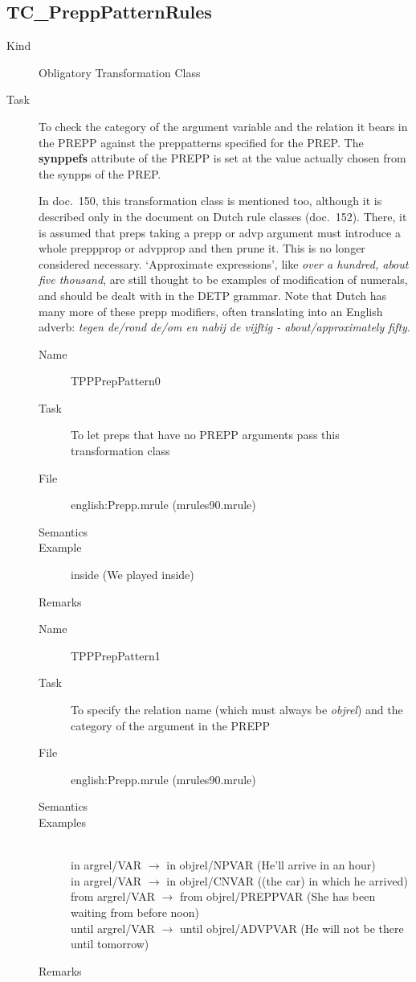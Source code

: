 \newpage
\subsection{TC\_PreppPatternRules}
\begin{description}
\item[Kind] Obligatory Transformation Class
\item[Task] To check the category of the argument variable and the relation 
it bears in the PREPP against the preppatterns specified for the PREP. The {\bf 
synppefs} attribute of the PREPP is set at the value 
actually chosen from the synpps of the PREP.

In doc.\ 150, this transformation class is mentioned too, although it is 
described only in the document on Dutch rule classes (doc.\ 152). There, it is 
assumed that preps taking a prepp or advp argument must introduce a whole 
preppprop or advpprop and then prune it. This is no longer considered 
necessary. `Approximate 
expressions', like {\em over a hundred, about five thousand\/}, are still 
thought to be examples of modification of numerals, and should be dealt with in 
the DETP grammar. Note that Dutch has many more of these prepp modifiers, often 
translating into an English adverb: {\em tegen de/rond de/om en nabij de 
vijftig - about/approximately fifty\/}.

\vspace{1 cm}
\begin{description}
\item[Name] TPPPrepPattern0
\item[Task] To let preps that have no PREPP arguments pass this transformation 
class
\item[File] english:Prepp.mrule (mrules90.mrule)
\item[Semantics]
\item[Example] inside (We played inside)
\item[Remarks]
\end{description}

\vspace{1 cm}
\begin{description}
\item[Name] TPPPrepPattern1
\item[Task] To specify the relation name (which must always be {\em objrel\/})
and the category of the argument in the PREPP 
\item[File] english:Prepp.mrule (mrules90.mrule)
\item[Semantics]
\item[Examples] \mbox{}\\
in argrel/VAR $\rightarrow$ in objrel/NPVAR  (He'll arrive in an hour)\\
in argrel/VAR $\rightarrow$ in objrel/CNVAR ((the car) in which he arrived)\\
from  argrel/VAR $\rightarrow$ from objrel/PREPPVAR (She has been waiting from 
before noon)\\
until argrel/VAR $\rightarrow$ until objrel/ADVPVAR (He will not be 
there until tomorrow)
\item[Remarks] 
\end{description}


\end{description}
